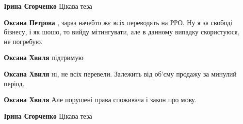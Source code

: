 \begin{itemize}
\begin{itemize}
 
\textbf{Ірина Єгорченко} Цікава теза

 
\textbf{Оксана Петрова} , зараз начебто жє всіх переводять на РРО. Ну я за
свободі бізнесу, і як шошо, то вийду мітингувати, але в данному випадку
скористуюся, не погребую.

 
\textbf{Оксана Хвиля} підтримую

 
\textbf{Оксана Хвиля} ні, не всіх перевели. Залежить від об'єму продажу за минулий період.

 
\textbf{Оксана Хвиля} Але порушені права споживача і закон про мову.

 
\textbf{Ірина Єгорченко} Цікава теза

\end{itemize}

 


\end{itemize}
